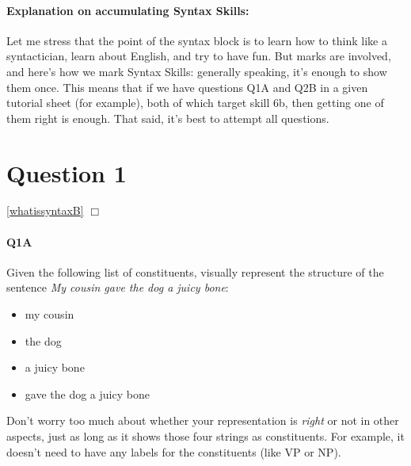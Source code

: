 \documentclass{article}
\begin{document}
\maketitle
\subtitle{Tutorial Notes Week 5: Topics 1, 2 \& 3}

\paragraph{Explanation on accumulating Syntax Skills:} Let me stress that the point of the syntax block is to learn how to think like a syntactician, learn about English, and try to have fun. But marks are involved, and here's how we mark Syntax Skills: generally speaking, it's enough to show them once. This means that if we have questions Q1A and Q2B in a given tutorial sheet (for example), both of which target skill 6b, then getting one of them right is enough. That said, it's best to attempt all questions.

\section*{Question 1}
\hfill{}
\ref{whatissyntaxB} $\Box$

\paragraph{Q1A} Given the following list of constituents, visually represent the structure of the sentence \emph{My cousin gave the dog a juicy bone}:
\begin{itemize}
    \item my cousin
    \item the dog
    \item a juicy bone
    \item gave the dog a juicy bone
\end{itemize}
Don’t worry too much about whether your representation is \emph{right} or not in other aspects, just as long as it
shows those four strings as constituents. For example, it doesn't need to have any labels for the constituents (like VP or NP).
\end{document}

